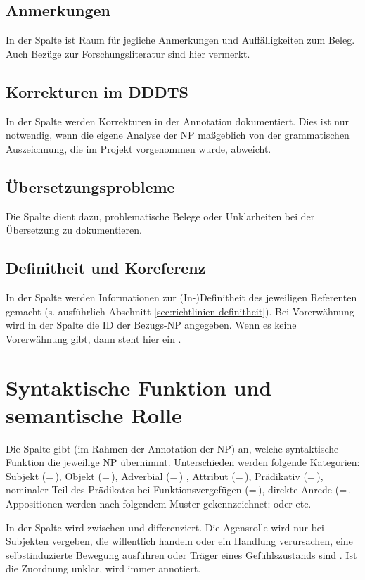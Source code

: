 \subsection{Anmerkungen} 
In der Spalte  ist Raum für jegliche Anmerkungen und Auffälligkeiten zum Beleg. Auch Bezüge zur Forschungsliteratur sind hier vermerkt.

\subsection{Korrekturen im DDDTS} 

In der Spalte  werden Korrekturen in der Annotation dokumentiert. Dies ist nur notwendig, wenn die eigene Analyse der NP maßgeblich von der grammatischen Auszeichnung, die im Projekt vorgenommen wurde, abweicht. 

\subsection{Übersetzungsprobleme} 
Die Spalte  dient dazu, problematische Belege oder Unklarheiten bei der Übersetzung zu dokumentieren. 
  
\subsection{Definitheit und Koreferenz} 

In der Spalte  werden Informationen zur (In-)Definitheit des jeweiligen Referenten gemacht (s. ausführlich Abschnitt \ref{sec:richtlinien-definitheit}). Bei Vorerwähnung wird in der Spalte  die ID der Bezugs-NP angegeben. Wenn es keine Vorerwähnung gibt, dann steht hier ein .


\section{Syntaktische Funktion und semantische Rolle} \label{sec:richtlinien-semantische-rolle}

Die Spalte  gibt (im Rahmen der Annotation der NP) an, welche syntaktische Funktion die jeweilige NP übernimmt. Unterschieden werden folgende Kategorien: Subjekt (=\,), Objekt (=\,), Adverbial (=\,)%
, Attribut (=\,), Prädikativ (=\,), nominaler Teil des Prädikates bei Funktionsvergefügen (=\,), direkte Anrede (=\,. Appositionen werden nach folgendem Muster gekennzeichnet:  oder  etc. 

In der Spalte  wird zwischen  und  differenziert. Die Agensrolle wird nur bei Subjekten vergeben, die willentlich handeln oder ein Handlung verursachen, eine selbstinduzierte Bewegung ausführen oder Träger eines Gefühlszustands sind \parencite[gemäß den Proto-Agensdimensionen in][]{Dowty1991,Primus2012}. Ist die Zuordnung unklar, wird immer  annotiert. 
 
